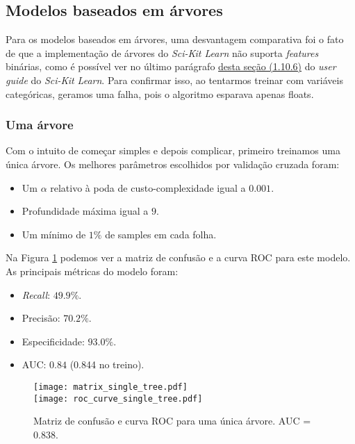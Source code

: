 \subsection{Modelos baseados em árvores}

Para os modelos baseados em árvores, uma desvantagem comparativa foi o fato de que a implementação de árvores do \emph{Sci-Kit Learn} não suporta \emph{features} binárias, como é possível ver no último parágrafo \href{https://scikit-learn.org/stable/modules/tree.html#tree-algorithms-id3-c4-5-c5-0-and-cart}{desta seção (1.10.6)} do \emph{user guide} do \emph{Sci-Kit Learn}.
Para confirmar isso, ao tentarmos treinar com variáveis categóricas, geramos uma falha, pois o algoritmo esparava apenas floats.

\subsubsection{Uma árvore}

Com o intuito de começar simples e depois complicar, primeiro treinamos uma única árvore.
Os melhores parâmetros escolhidos por validação cruzada foram:
\begin{itemize}
    \item Um \( \alpha \) relativo à poda de custo-complexidade igual a \( 0.001 \).
    \item  Profundidade máxima igual a \( 9 \).
    \item Um mínimo de \( 1 \% \) de samples em cada folha.
\end{itemize}

Na Figura \ref{single tree metric} podemos ver a matriz de confusão e a curva ROC para este modelo.
As principais métricas do modelo foram:
\begin{itemize}
    \item \emph{Recall}: \( 49.9 \% \).
    \item Precisão: \( 70.2 \% \).
    \item Especificidade: \( 93.0 \% \).
    \item AUC: \( 0.84 \) (0.844 no treino).
\end{itemize}
\begin{figure}[htb]
    \begin{center}
        \texttt{[image: matrix\_single\_tree.pdf]} \\
        \texttt{[image: roc\_curve\_single\_tree.pdf]}
    \end{center}
    \caption{Matriz de confusão e curva ROC para uma única árvore. AUC = 0.838.}
    \label{single tree metric}
\end{figure}

